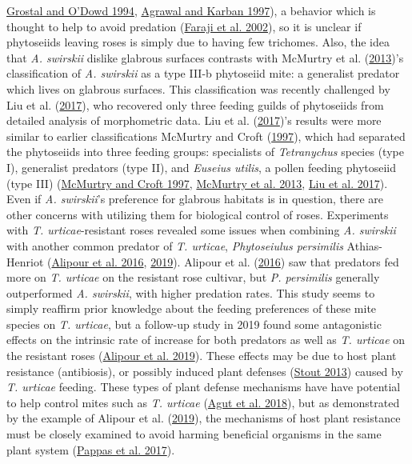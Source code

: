\documentclass{ufdissertation}[overrideChapters] %
\begin{document}
{\protect\hyperlink{ref-Grostal1994}{Grostal and O'Dowd 1994}, \protect\hyperlink{ref-Agrawal1997}{Agrawal and Karban 1997}), a behavior which is thought to help to avoid predation (\protect\hyperlink{ref-Faraji2002}{Faraji et al. 2002}), so it is unclear if phytoseiids leaving roses is simply due to having few trichomes. Also, the idea that \emph{A. swirskii} dislike glabrous surfaces contrasts with McMurtry et al. (\protect\hyperlink{ref-McMurtry2013}{2013})'s classification of \emph{A. swirskii} as a type III-b phytoseiid mite: a generalist predator which lives on glabrous surfaces. This classification was recently challenged by Liu et al. (\protect\hyperlink{ref-Liu2017}{2017}), who recovered only three feeding guilds of phytoseiids from detailed analysis of morphometric data. Liu et al. (\protect\hyperlink{ref-Liu2017}{2017})'s results were more similar to earlier classifications McMurtry and Croft (\protect\hyperlink{ref-McMurtry1997}{1997}), which had separated the phytoseiids into three feeding groups: specialists of \emph{Tetranychus} species (type I), generalist predators (type II), and \emph{Euseius utilis}, a pollen feeding phytoseiid (type III) (\protect\hyperlink{ref-McMurtry1997}{McMurtry and Croft 1997}, \protect\hyperlink{ref-McMurtry2013}{McMurtry et al. 2013}, \protect\hyperlink{ref-Liu2017}{Liu et al. 2017}). Even if \emph{A. swirskii}'s preference for glabrous habitats is in question, there are other concerns with utilizing them for biological control of roses. Experiments with \emph{T. urticae}-resistant roses revealed some issues when combining \emph{A. swirskii} with another common predator of \emph{T. urticae}, \emph{Phytoseiulus persimilis} Athias-Henriot (\protect\hyperlink{ref-Alipour2016}{Alipour et al. 2016}, \protect\hyperlink{ref-Alipour2019}{2019}). Alipour et al. (\protect\hyperlink{ref-Alipour2016}{2016}) saw that predators fed more on \emph{T. urticae} on the resistant rose cultivar, but \emph{P. persimilis} generally outperformed \emph{A. swirskii}, with higher predation rates. This study seems to simply reaffirm prior knowledge about the feeding preferences of these mite species on \emph{T. urticae}, but a follow-up study in 2019 found some antagonistic effects on the intrinsic rate of increase for both predators as well as \emph{T. urticae} on the resistant roses (\protect\hyperlink{ref-Alipour2019}{Alipour et al. 2019}). These effects may be due to host plant resistance (antibiosis), or possibly induced plant defenses (\protect\hyperlink{ref-Stout2013}{Stout 2013}) caused by \emph{T. urticae} feeding. These types of plant defense mechanisms have have potential to help control mites such as \emph{T. urticae} (\protect\hyperlink{ref-Agut2018}{Agut et al. 2018}), but as demonstrated by the example of Alipour et al. (\protect\hyperlink{ref-Alipour2019}{2019}), the mechanisms of host plant resistance must be closely examined to avoid harming beneficial organisms in the same plant system (\protect\hyperlink{ref-Pappas2017}{Pappas et al. 2017}).

}
\end{document}
